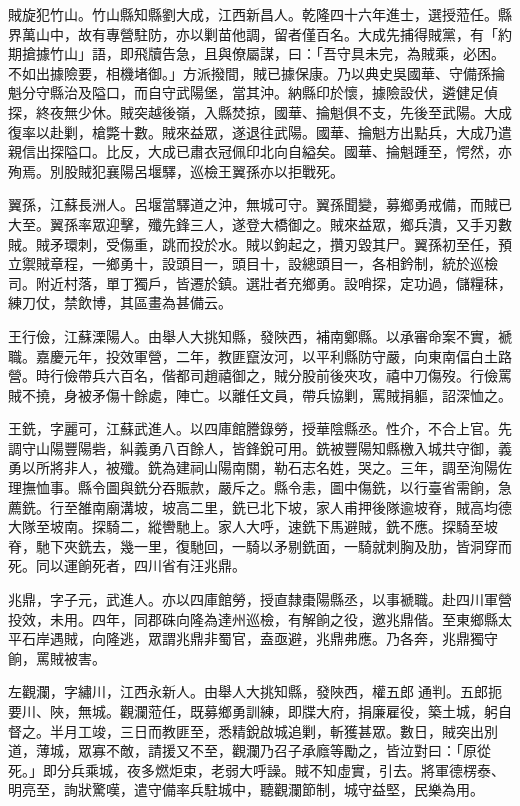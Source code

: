 \begin{pinyinscope}
賊旋犯竹山。竹山縣知縣劉大成，江西新昌人。乾隆四十六年進士，選授蒞任。縣界萬山中，故有專營駐防，亦以剿苗他調，留者僅百名。大成先捕得賊黨，有「約期搶據竹山」語，即飛牘告急，且與僚屬謀，曰：「吾守具未完，為賊乘，必困。不如出據險要，相機堵御。」方派撥間，賊已據保康。乃以典史吳國華、守備孫掄魁分守縣治及隘口，而自守武陽堡，當其沖。納縣印於懷，據險設伏，遴健足偵探，終夜無少休。賊突越後嶺，入縣焚掠，國華、掄魁俱不支，先後至武陽。大成復率以赴剿，槍斃十數。賊來益眾，遂退往武陽。國華、掄魁方出點兵，大成乃遣親信出探隘口。比反，大成已肅衣冠佩印北向自縊矣。國華、掄魁踵至，愕然，亦殉焉。別股賊犯襄陽呂堰驛，巡檢王翼孫亦以拒戰死。

翼孫，江蘇長洲人。呂堰當驛道之沖，無城可守。翼孫聞變，募鄉勇戒備，而賊已大至。翼孫率眾迎擊，殲先鋒三人，遂登大橋御之。賊來益眾，鄉兵潰，又手刃數賊。賊矛環刺，受傷重，跳而投於水。賊以鉤起之，攢刃毀其尸。翼孫初至任，預立禦賊章程，一鄉勇十，設頭目一，頭目十，設總頭目一，各相鈐制，統於巡檢司。附近村落，單丁獨戶，皆遷於鎮。選壯者充鄉勇。設哨探，定功過，儲糧秣，練刀仗，禁飲博，其區畫為甚備云。

王行儉，江蘇溧陽人。由舉人大挑知縣，發陜西，補南鄭縣。以承審命案不實，褫職。嘉慶元年，投效軍營，二年，教匪竄汝河，以平利縣防守嚴，向東南偪白土路營。時行儉帶兵六百名，偕都司趙禧御之，賊分股前後夾攻，禧中刀傷歿。行儉罵賊不撓，身被矛傷十餘處，陣亡。以離任文員，帶兵協剿，罵賊捐軀，詔深恤之。

王銑，字麗可，江蘇武進人。以四庫館謄錄勞，授華陰縣丞。性介，不合上官。先調守山陽豐陽砦，糾義勇八百餘人，皆鋒銳可用。銑被豐陽知縣檄入城共守御，義勇以所將非人，被殲。銑為建祠山陽南關，勒石志名姓，哭之。三年，調至洵陽佐理撫恤事。縣令圖與銑分吞賑款，嚴斥之。縣令恚，圖中傷銑，以行臺省需餉，急薦銑。行至雒南廟溝坡，坡高二里，銑已北下坡，家人甫押後隊逾坡脊，賊高均德大隊至坡南。探騎二，縱轡馳上。家人大呼，速銑下馬避賊，銑不應。探騎至坡脊，馳下夾銑去，幾一里，復馳回，一騎以矛剔銑面，一騎就刺胸及肋，皆洞穿而死。同以運餉死者，四川省有汪兆鼎。

兆鼎，字子元，武進人。亦以四庫館勞，授直隸棗陽縣丞，以事褫職。赴四川軍營投效，未用。四年，同郡硃向隆為達州巡檢，有解餉之役，邀兆鼎偕。至東鄉縣太平石岸遇賊，向隆逃，眾謂兆鼎非蜀官，盍亟避，兆鼎弗應。乃各奔，兆鼎獨守餉，罵賊被害。

左觀瀾，字繡川，江西永新人。由舉人大挑知縣，發陜西，權五郎通判。五郎扼要川、陜，無城。觀瀾蒞任，既募鄉勇訓練，即牒大府，捐廉雇役，築土城，躬自督之。半月工竣，三日而教匪至，悉精銳啟城追剿，斬獲甚眾。數日，賊突出別道，薄城，眾寡不敵，請援又不至，觀瀾乃召子承廕等勵之，皆泣對曰：「原從死。」即分兵乘城，夜多燃炬束，老弱大呼譟。賊不知虛實，引去。將軍德楞泰、明亮至，詢狀驚嘆，遣守備率兵駐城中，聽觀瀾節制，城守益堅，民樂為用。


\end{pinyinscope}
